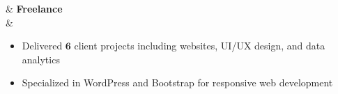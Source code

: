 \documentclass[11pt,a4paper]{article}  %
\begin{document}
{\begin{ressection}
     &
        \textbf{Freelance}
        \hfill{}
    \\
    

    & \begin{itemize}
        
        \item Delivered $\bm{6}$ client projects including websites, UI/UX design, and data analytics
        \item Specialized in WordPress and Bootstrap for responsive web development
    \end{itemize}
\end{ressection}


} %
\end{document}
